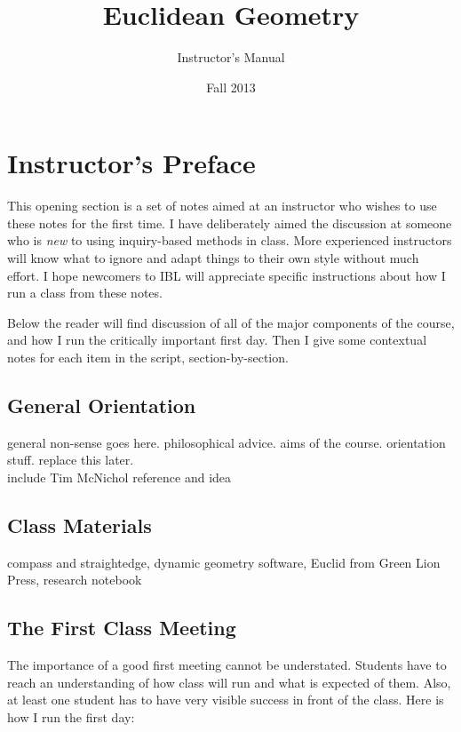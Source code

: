 \documentclass{tufte-handout}
\title{Euclidean Geometry}
\author[Instructor's Manual]{Instructor's Manual}
\date{Fall 2013}
\theoremstyle{definition}
\begin{document}
\maketitle


\setcounter{section}{0}
\section{Instructor's Preface}

This opening section is a set of notes aimed at an instructor who wishes to use these notes for the first time.
I have deliberately aimed the discussion at someone who is \emph{new} to using inquiry-based methods in class.
More experienced instructors will know what to ignore and adapt things to their own style without much effort.
I hope newcomers to IBL will appreciate specific instructions about how I run a class from these notes.

Below the reader will find discussion of all of the major components of the course, and how I run the critically important first day.
Then I give some contextual notes for each item in the script, section-by-section.

\subsection{General Orientation}



general non-sense goes here. philosophical advice. aims of the course. orientation stuff.  replace this later.\\

include Tim McNichol reference and idea

\subsection{Class Materials}

compass and straightedge, dynamic geometry software, Euclid from Green Lion Press, 
research notebook


\subsection{The First Class Meeting}

The importance of a good first meeting cannot be understated.
Students have to reach an understanding of how class will run and what is expected of them.
Also, at least one student has to have very visible success in front of the class.
Here is how I run the first day:\\[.1in]
\end{document}
